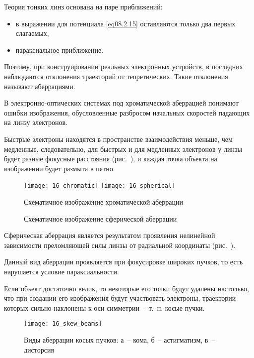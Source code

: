 
Теория тонких линз основана на паре приближений:
\begin{itemize}
  \item в выражении для потенциала \eqref{eq08.2.15} оставляются только два
    первых слагаемых,
  \item параксиальное приближение.
\end{itemize}

Поэтому, при конструировании реальных электронных устройств, в последних
наблюдаются отклонения траекторий от теоретических. Такие отклонения называют
аберрациями.


В электронно-оптических системах под хроматической аберрацией понимают ошибки
изображения, обусловленные разбросом начальных скоростей падающих на линзу
электронов.

Быстрые электроны находятся в пространстве взаимодействия меньше, чем медленные,
следовательно, для быстрых и для медленных электронов у линзы будет разные
фокусные расстояния (рис.~), и каждая точка объекта на изображении
будет размыта в пятно.

\begin{figure}[h!]
  \center
  \vspace{-2em}
  \texttt{[image: 16\_chromatic]} \hspace{1em}
  \texttt{[image: 16\_spherical]} \\
  \parbox{.3\textwidth}{\caption{Схематичное изображение хроматической
    аберрации} \label{pic16chrome}} \hspace{1em}
  \parbox{.3\textwidth}{\caption{Схематичное изображение сферической
    аберрации} \label{pic16sphere}}
  \vspace{-2em}
\end{figure}


Сферическая аберрация является результатом проявления нелинейной зависимости
преломляющей силы линзы от радиальной координаты (рис.~).

Данный вид аберрации проявляется при фокусировке широких пучков, то есть
нарушается условие параксиальности.


Если объект достаточно велик, то некоторые его точки будут удалены настолько,
что при создании его изображения будут участвовать электроны, траектории которых
сильно наклонены к оси симметрии~-- т.~н. косые пучки.
\begin{figure}[h!]
  \center
  \texttt{[image: 16\_skew\_beams]} \\
  \caption{Виды аберрации косых пучков: а~-- кома, б~-- астигматизм, в~--
    дисторсия}
  \label{pic16skew}
\end{figure}

